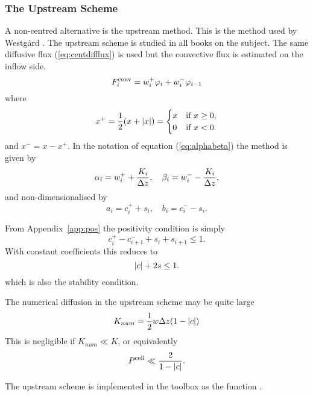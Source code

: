 \subsubsection{The Upstream Scheme}

A non-centred alternative is the upstream method.  This is the method
used by West\-g{\aa}rd .  The upstream scheme is
studied in all books on the subject.  The same diffusive flux
(\ref{eq:centdifflux}) is used but the convective flux is estimated on
the inflow side.
\begin{equation}\label{eq:usflux}
  F^{\mathrm{conv}}_i = w_i^+ \varphi_i + w_i^- \varphi_{i-1}
\end{equation}
where 
\begin{equation}
   x^+ = \frac{1}{2} (x + |x|) = 
       \begin{cases}
          x& \text{if $x \ge 0$},\\
          0& \text{if $x  < 0$}.
       \end{cases}
\end{equation}
and $x^- = x - x^+$.
In the notation of equation (\ref{eq:alphabeta}) the method is given by
\begin{equation}
   \alpha_i =  w_i^+ + \frac{K_i}{\Delta z} , \quad 
   \beta_i  =  w_i^- - \frac{K_i}{\Delta z} ,
\end{equation}
and non-dimensionalised by
\begin{equation}
   a_i = c_i^+ + s_i , \quad 
   b_i = c_i^- - s_i .
\end{equation}

From Appendix~\ref{app:pos} the positivity condition is simply
\begin{equation}\label{eq:uspos}
  c_i^+ - c_{i+1}^- + s_i + s_{i+1} \le 1 .
\end{equation}
With constant coefficients this reduces to
\begin{equation}
  |c| + 2 s \le 1 .
\end{equation}
which is also the stability condition.

The numerical diffusion in the upstream scheme may be quite large
\begin{equation}
  K_{num} = \frac{1}{2} w \Delta z (1-|c|)
\end{equation}
This is negligible if $K_{num} \ll K$, or equivalently
\begin{equation}
  P^{\mathrm{cell}} \ll \frac{2}{1 - |c|} .
\end{equation}

The upstream scheme is implemented in the toolbox as the function
.

